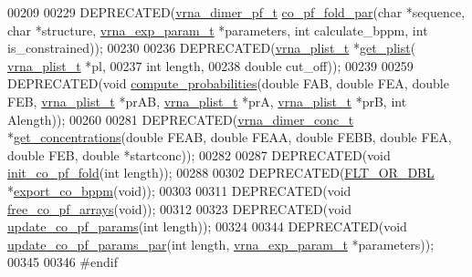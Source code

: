 \begin{DoxyCode}
00209 
00229 DEPRECATED(\hyperlink{group__pf__cofold_structvrna__dimer__pf__s}{vrna\_dimer\_pf\_t} \hyperlink{part__func__co_8h_aabfc6cb6d02b8f08ac4c92f4f5b125d9}{co\_pf\_fold\_par}(\textcolor{keywordtype}{char} *sequence, \textcolor{keywordtype}{char} *structure, 
      \hyperlink{group__energy__parameters_structvrna__exp__param__s}{vrna\_exp\_param\_t} *parameters, \textcolor{keywordtype}{int} calculate\_bppm, \textcolor{keywordtype}{int} is\_constrained));
00230 
00236 DEPRECATED(\hyperlink{group__data__structures_structvrna__plist__s}{vrna\_plist\_t}  *\hyperlink{part__func__co_8h_a162b6177b14a4156172105a34c09f278}{get\_plist}( \hyperlink{group__data__structures_structvrna__plist__s}{vrna\_plist\_t} *pl,
00237                               \textcolor{keywordtype}{int} length,
00238                               \textcolor{keywordtype}{double} cut\_off));
00239 
00259 DEPRECATED(\textcolor{keywordtype}{void} \hyperlink{part__func__co_8h_a21f8f4a97f904d5d805d571081b2f5f9}{compute\_probabilities}(\textcolor{keywordtype}{double} FAB, \textcolor{keywordtype}{double} FEA, \textcolor{keywordtype}{double} FEB, 
      \hyperlink{group__data__structures_structvrna__plist__s}{vrna\_plist\_t}  *prAB, \hyperlink{group__data__structures_structvrna__plist__s}{vrna\_plist\_t}  *prA, \hyperlink{group__data__structures_structvrna__plist__s}{vrna\_plist\_t}  *prB, \textcolor{keywordtype}{int} 
      Alength));
00260 
00281 DEPRECATED(\hyperlink{group__pf__cofold_structvrna__dimer__conc__s}{vrna\_dimer\_conc\_t} *\hyperlink{part__func__co_8h_a163159722a422ba90335a601fc34b8fb}{get\_concentrations}(\textcolor{keywordtype}{double} FEAB, \textcolor{keywordtype}{double} 
      FEAA, \textcolor{keywordtype}{double} FEBB, \textcolor{keywordtype}{double} FEA, \textcolor{keywordtype}{double} FEB, \textcolor{keywordtype}{double} *startconc));
00282 
00287 DEPRECATED(\textcolor{keywordtype}{void}   \hyperlink{part__func__co_8h_aa12dda9dd6179cdd22bcce87c0682c07}{init\_co\_pf\_fold}(\textcolor{keywordtype}{int} length));
00288 
00302 DEPRECATED(\hyperlink{group__data__structures_ga31125aeace516926bf7f251f759b6126}{FLT\_OR\_DBL} *\hyperlink{part__func__co_8h_ad94c0133157bed6912fe7fe866e0039e}{export\_co\_bppm}(\textcolor{keywordtype}{void}));
00303 
00311 DEPRECATED(\textcolor{keywordtype}{void} \hyperlink{part__func__co_8h_ade3ce34ae8214811374b1d28a40dc247}{free\_co\_pf\_arrays}(\textcolor{keywordtype}{void}));
00312 
00323 DEPRECATED(\textcolor{keywordtype}{void} \hyperlink{part__func__co_8h_a6e0f36c1f9b7d9dd4bfbad914c1119e5}{update\_co\_pf\_params}(\textcolor{keywordtype}{int} length));
00324 
00344 DEPRECATED(\textcolor{keywordtype}{void} \hyperlink{part__func__co_8h_a75465d7e8793db68a434d83df9a2e794}{update\_co\_pf\_params\_par}(\textcolor{keywordtype}{int} length, 
      \hyperlink{group__energy__parameters_structvrna__exp__param__s}{vrna\_exp\_param\_t} *parameters));
00345 
00346 \textcolor{preprocessor}{#endif}
\end{DoxyCode}
